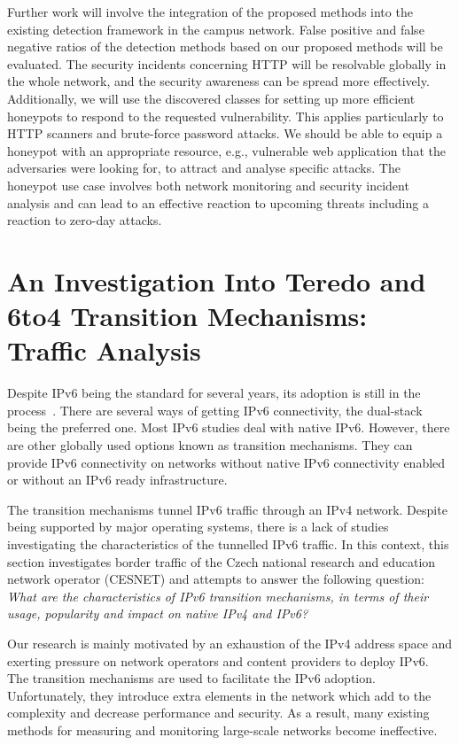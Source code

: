 Further work will involve the integration of the proposed methods into the existing detection framework in the campus network. False positive and false negative ratios of the detection methods based on our proposed methods will be evaluated. The security incidents concerning HTTP will be resolvable globally in the whole network, and the security awareness can be spread more effectively. 
Additionally, we will use the discovered classes for setting up more efficient honeypots to respond to the requested vulnerability. This applies particularly to HTTP scanners and brute-force password attacks. We should be able to equip a honeypot with an appropriate resource, e.g., vulnerable web application that the adversaries were looking for, to attract and analyse specific attacks. 
The honeypot use case involves both network monitoring and security incident analysis and can lead to an effective reaction to upcoming threats including a reaction to zero-day attacks.


\section{An Investigation Into Teredo and 6to4 Transition Mechanisms: Traffic Analysis}\label{sec:analysis-ipv6-transition}

Despite IPv6 being the standard for several years, its adoption is still in the process~\cite{Claffy-2011-Tracking}. There are several ways of getting IPv6 connectivity, the dual-stack being the preferred one. Most IPv6 studies deal with native IPv6. However, there are other globally used options known as transition mechanisms. They can provide IPv6 connectivity on networks without native IPv6 connectivity enabled or without an IPv6 ready infrastructure.

The transition mechanisms tunnel IPv6 traffic through an IPv4 network. Despite being supported by major operating systems, there is a lack of studies investigating the characteristics of the tunnelled IPv6 traffic. In this context, this section investigates border traffic of the Czech national research and education network operator (CESNET) and attempts to answer the following question: \emph{What are the characteristics of IPv6 transition mechanisms, in terms of their usage, popularity and impact on native IPv4 and IPv6?}

Our research is mainly motivated by an exhaustion of the IPv4 address space and exerting pressure on network operators and content providers to deploy IPv6. The transition mechanisms are used to facilitate the IPv6 adoption. Unfortunately, they introduce extra elements in the network which add to the complexity and decrease performance and security. As a result, many existing methods for measuring and monitoring large-scale networks become ineffective.

